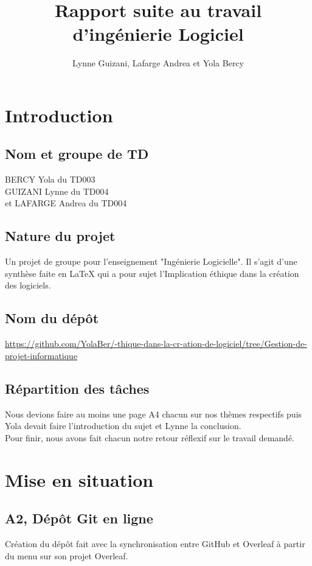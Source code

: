 \documentclass{article}
\title{Rapport suite au travail d'ingénierie Logiciel}
\author{Lynne Guizani, Lafarge Andrea et Yola Bercy}
\begin{document}
\maketitle

\section{Introduction}
\subsection{Nom et groupe de TD}
BERCY Yola du TD003\\
GUIZANI Lynne du TD004 \\
et LAFARGE Andrea du TD004 \\

\subsection{Nature du projet}
Un projet de groupe pour l'enseignement "Ingénierie Logicielle". Il s'agit d'une synthèse faite en LaTeX qui a pour sujet l'Implication éthique dans la création des logiciels.

\subsection{Nom du dépôt}
\url{https://github.com/YolaBer/-thique-dans-la-cr-ation-de-logiciel/tree/Gestion-de-projet-informatique}

\subsection{Répartition des tâches}
Nous devions faire au moins une page A4 chacun sur nos thèmes respectifs puis Yola devait faire l'introduction du sujet et Lynne la conclusion.\\
Pour finir, nous avons fait chacun notre retour réflexif sur le travail demandé.

\section{Mise en situation}

\subsection{A2, Dépôt Git en ligne}
Création du dépôt fait avec la synchronisation entre GitHub et Overleaf à partir du menu sur son projet Overleaf.
\end{document}
